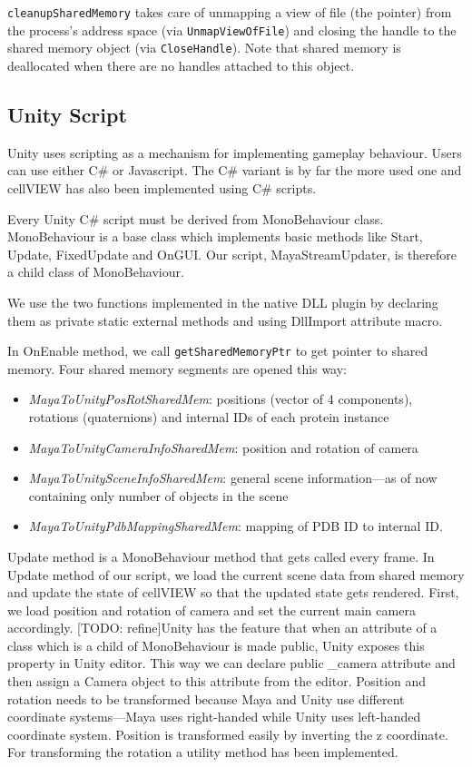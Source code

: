 \documentclass[
  digital, %
  table,   %
  nolof,     %
  nolot,     %
]{fithesis3}
\begin{document}
\texttt{cleanupSharedMemory} takes care of unmapping a view of file (the pointer) from the process's address space (via \texttt{UnmapViewOfFile}) and closing the handle to the shared memory object (via \texttt{CloseHandle}). Note that shared memory is deallocated when there are no handles attached to this object.

\subsection{Unity Script}
Unity uses scripting as a mechanism for implementing gameplay behaviour. Users can use either C\# or Javascript. The C\# variant is by far the more used one and cellVIEW has also been implemented using C\# scripts.

Every Unity C\# script must be derived from MonoBehaviour class. MonoBehaviour is a base class which implements basic methods like Start, Update, FixedUpdate and OnGUI. Our script, MayaStreamUpdater, is therefore a child class of MonoBehaviour.

We use the two functions implemented in the native DLL plugin by declaring them as private static external methods and using DllImport attribute macro.

In OnEnable method, we call \texttt{getSharedMemoryPtr} to get pointer to shared memory. Four shared memory segments are opened this way:
\begin{itemize}
\item \textit{MayaToUnityPosRotSharedMem}: positions (vector of 4 components), rotations (quaternions) and internal IDs of each protein instance
\item \textit{MayaToUnityCameraInfoSharedMem}: position and rotation of camera
\item \textit{MayaToUnitySceneInfoSharedMem}: general scene information—as of now containing only number of objects in the scene
\item \textit{MayaToUnityPdbMappingSharedMem}: mapping of PDB ID to internal ID.
\end{itemize}

Update method is a MonoBehaviour method that gets called every frame. In Update method of our script, we load the current scene data from shared memory and update the state of cellVIEW so that the updated state gets rendered. First, we load position and rotation of camera and set the current main camera accordingly. [TODO: refine]Unity has the feature that when an attribute of a class which is a child of MonoBehaviour is made public, Unity exposes this property in Unity editor. This way we can declare public \_camera attribute and then assign a Camera object to this attribute from the editor. Position and rotation needs to be transformed because Maya and Unity use different coordinate systems—Maya uses right-handed while Unity uses left-handed coordinate system. Position is transformed easily by inverting the z coordinate. For transforming the rotation a utility method has been implemented.
\end{document}
